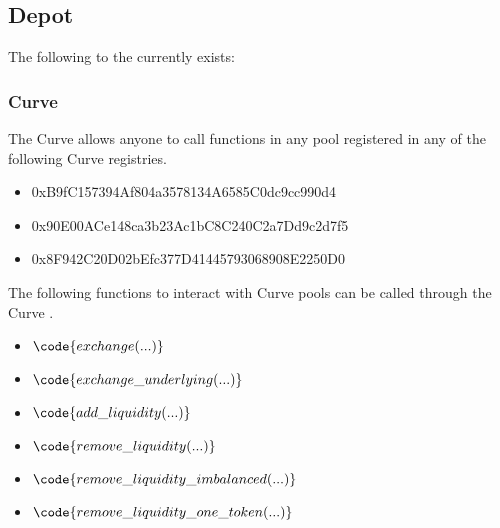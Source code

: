 \documentclass[class=article, crop=false]{standalone}
\begin{document}
\subsection{Depot}
The following  to the  currently exists:

\subsubsection{Curve}
The Curve  allows anyone to call functions in any pool registered in any of the following Curve registries.
\begin{itemize}
    \item 0xB9fC157394Af804a3578134A6585C0dc9cc990d4
    \item 0x90E00ACe148ca3b23Ac1bC8C240C2a7Dd9c2d7f5
    \item 0x8F942C20D02bEfc377D41445793068908E2250D0
\end{itemize}

The following functions to interact with Curve pools can be called through the Curve .
\begin{itemize}
    \item $\code{exchange(...)}$
    \item $\code{exchange\_underlying(...)}$
    \item $\code{add\_liquidity(...)}$
    \item $\code{remove\_liquidity(...)}$
    \item $\code{remove\_liquidity\_imbalanced(...)}$
    \item $\code{remove\_liquidity\_one\_token(...)}$
\end{itemize}
\end{document}
